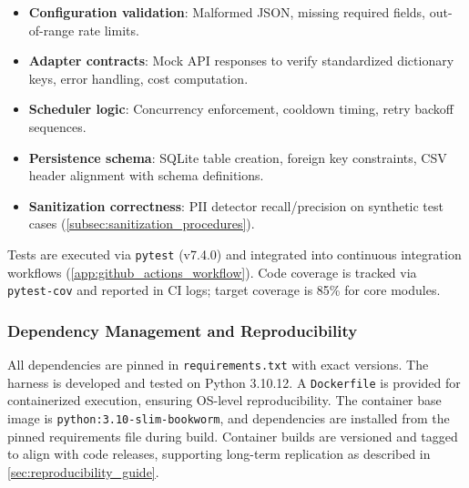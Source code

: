 \begin{itemize}
\item \textbf{Configuration validation}: Malformed JSON, missing required fields, out-of-range rate limits.
\item \textbf{Adapter contracts}: Mock API responses to verify standardized dictionary keys, error handling, cost computation.
\item \textbf{Scheduler logic}: Concurrency enforcement, cooldown timing, retry backoff sequences.
\item \textbf{Persistence schema}: SQLite table creation, foreign key constraints, CSV header alignment with schema definitions.
\item \textbf{Sanitization correctness}: PII detector recall/precision on synthetic test cases (\cref{subsec:sanitization_procedures}).
\end{itemize}

Tests are executed via \texttt{pytest} (v7.4.0) and integrated into continuous integration workflows (\cref{app:github_actions_workflow}). Code coverage is tracked via \texttt{pytest-cov} and reported in CI logs; target coverage is 85\% for core modules.

\subsubsection{Dependency Management and Reproducibility}

All dependencies are pinned in \texttt{requirements.txt} with exact versions. The harness is developed and tested on Python 3.10.12. A \texttt{Dockerfile} is provided for containerized execution, ensuring OS-level reproducibility. The container base image is \texttt{python:3.10-slim-bookworm}, and dependencies are installed from the pinned requirements file during build. Container builds are versioned and tagged to align with code releases, supporting long-term replication as described in \cref{sec:reproducibility_guide}.